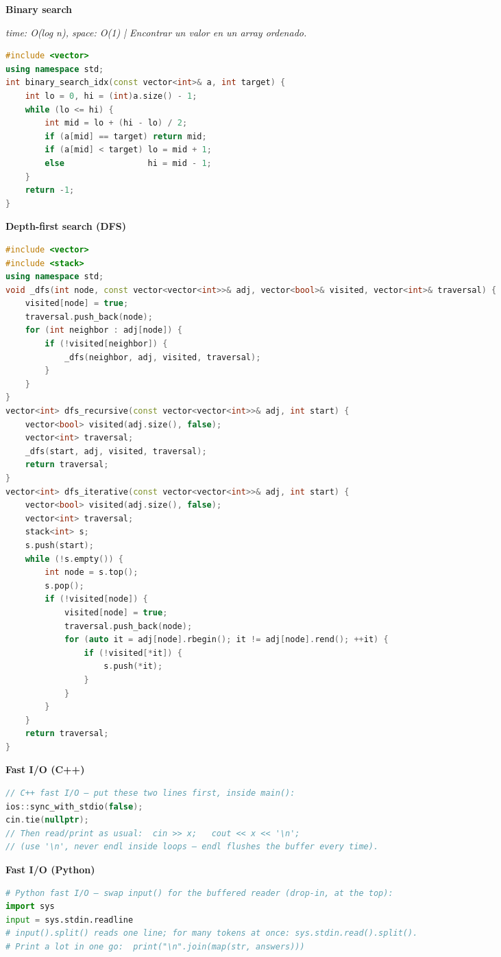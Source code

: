 \documentclass[8pt,a4paper,landscape]{extarticle}
\makeatletter
\newcommand{\csalgo}[1]{%
  \vspace{0.8ex}%
  {\bfseries\small #1}\par
  \vspace{0.4ex}{\color{cs@rule}\hrule height 0.4pt}\vspace{0.5ex}%
}
\newcommand{\csstats}[1]{{\scriptsize\itshape #1\par\vspace{0.3ex}}}
\makeatother
\begin{document}
\begin{multicols}{3}
\csalgo{Binary search}
\csstats{time: O(log n), space: O(1)  |  Encontrar un valor en un array ordenado.}
\begin{lstlisting}[language=C++]
#include <vector>
using namespace std;
int binary_search_idx(const vector<int>& a, int target) {
    int lo = 0, hi = (int)a.size() - 1;
    while (lo <= hi) {
        int mid = lo + (hi - lo) / 2;
        if (a[mid] == target) return mid;
        if (a[mid] < target) lo = mid + 1;
        else                 hi = mid - 1;
    }
    return -1;
}
\end{lstlisting}

\csalgo{Depth-first search (DFS)}
\begin{lstlisting}[language=C++]
#include <vector>
#include <stack>
using namespace std;
void _dfs(int node, const vector<vector<int>>& adj, vector<bool>& visited, vector<int>& traversal) {
    visited[node] = true;
    traversal.push_back(node);
    for (int neighbor : adj[node]) {
        if (!visited[neighbor]) {
            _dfs(neighbor, adj, visited, traversal);
        }
    }
}
vector<int> dfs_recursive(const vector<vector<int>>& adj, int start) {
    vector<bool> visited(adj.size(), false);
    vector<int> traversal;
    _dfs(start, adj, visited, traversal);
    return traversal;
}
vector<int> dfs_iterative(const vector<vector<int>>& adj, int start) {
    vector<bool> visited(adj.size(), false);
    vector<int> traversal;
    stack<int> s;
    s.push(start);
    while (!s.empty()) {
        int node = s.top();
        s.pop();
        if (!visited[node]) {
            visited[node] = true;
            traversal.push_back(node);
            for (auto it = adj[node].rbegin(); it != adj[node].rend(); ++it) {
                if (!visited[*it]) {
                    s.push(*it);
                }
            }
        }
    }
    return traversal;
}
\end{lstlisting}

\csalgo{Fast I/O (C++)}
\begin{lstlisting}[language=C++]
// C++ fast I/O — put these two lines first, inside main():
ios::sync_with_stdio(false);
cin.tie(nullptr);
// Then read/print as usual:  cin >> x;   cout << x << '\n';
// (use '\n', never endl inside loops — endl flushes the buffer every time).
\end{lstlisting}

\csalgo{Fast I/O (Python)}
\begin{lstlisting}[language=Python]
# Python fast I/O — swap input() for the buffered reader (drop-in, at the top):
import sys
input = sys.stdin.readline
# input().split() reads one line; for many tokens at once: sys.stdin.read().split().
# Print a lot in one go:  print("\n".join(map(str, answers)))
\end{lstlisting}


\end{multicols}
\end{document}
